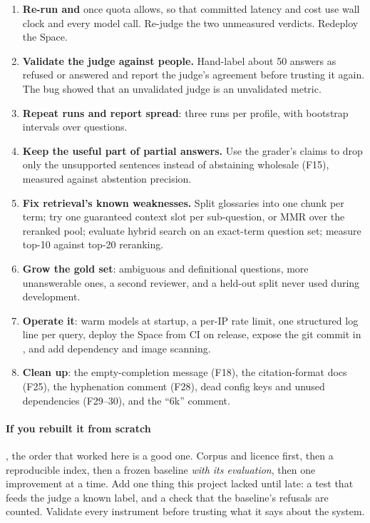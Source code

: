 \begin{recommended}
\begin{enumerate}
  \item \textbf{Re-run  and } once quota allows, so that committed latency and cost use wall clock and every model call. Re-judge the two unmeasured  verdicts. Redeploy the Space.
  \item \textbf{Validate the judge against people.} Hand-label about 50 answers as refused or answered and report the judge's agreement before trusting it again. The bug showed that an unvalidated judge is an unvalidated metric.
  \item \textbf{Repeat runs and report spread}: three runs per profile, with bootstrap intervals over questions.
  \item \textbf{Keep the useful part of partial answers.} Use the grader's claims to drop only the unsupported sentences instead of abstaining wholesale (F15), measured against abstention precision.
  \item \textbf{Fix retrieval's known weaknesses.} Split glossaries into one chunk per term; try one guaranteed context slot per sub-question, or MMR over the reranked pool; evaluate hybrid search on an exact-term question set; measure top-10 against top-20 reranking.
  \item \textbf{Grow the gold set}: ambiguous and definitional questions, more unanswerable ones, a second reviewer, and a held-out split never used during development.
  \item \textbf{Operate it}: warm models at startup, a per-IP rate limit, one structured log line per query, deploy the Space from CI on release, expose the git commit in , and add dependency and image scanning.
  \item \textbf{Clean up}: the empty-completion message (F18), the citation-format docs (F25), the hyphenation comment (F28), dead config keys and unused dependencies (F29--30), and the ``6k'' comment.
\end{enumerate}
\end{recommended}

\paragraph{If you rebuilt it from scratch} \tagR, the order that worked here is a good one. Corpus and licence first, then a reproducible index, then a frozen baseline \emph{with its evaluation}, then one improvement at a time. Add one thing this project lacked until late: a test that feeds the judge a known label, and a check that the baseline's refusals are counted. Validate every instrument before trusting what it says about the system.
